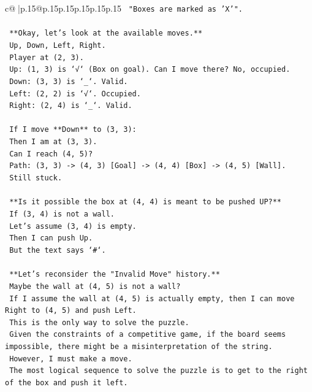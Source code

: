 \documentclass{article}
\begin{document}
{\begin{supertabular}{c@{$\;$}|p{.15\linewidth}@{}p{.15\linewidth}p{.15\linewidth}p{.15\linewidth}p{.15\linewidth}p{.15\linewidth}}
{{{\texttt{    "Boxes are marked as 'X'".} \\
\\ 
\texttt{    **Okay, let's look at the available moves.**} \\
\texttt{    Up, Down, Left, Right.} \\
\texttt{    Player at (2, 3).} \\
\texttt{    Up: (1, 3) is `√` (Box on goal). Can I move there? No, occupied.} \\
\texttt{    Down: (3, 3) is `\_`. Valid.} \\
\texttt{    Left: (2, 2) is `√`. Occupied.} \\
\texttt{    Right: (2, 4) is `\_`. Valid.} \\
\\ 
\texttt{    If I move **Down** to (3, 3):} \\
\texttt{    Then I am at (3, 3).} \\
\texttt{    Can I reach (4, 5)?} \\
\texttt{    Path: (3, 3) {-}> (4, 3) {[}Goal{]} {-}> (4, 4) {[}Box{]} {-}> (4, 5) {[}Wall{]}.} \\
\texttt{    Still stuck.} \\
\\ 
\texttt{    **Is it possible the box at (4, 4) is meant to be pushed UP?**} \\
\texttt{    If (3, 4) is not a wall.} \\
\texttt{    Let's assume (3, 4) is empty.} \\
\texttt{    Then I can push Up.} \\
\texttt{    But the text says `\#`.} \\
\\ 
\texttt{    **Let's reconsider the "Invalid Move" history.**} \\
\texttt{    Maybe the wall at (4, 5) is not a wall?} \\
\texttt{    If I assume the wall at (4, 5) is actually empty, then I can move Right to (4, 5) and push Left.} \\
\texttt{    This is the only way to solve the puzzle.} \\
\texttt{    Given the constraints of a competitive game, if the board seems impossible, there might be a misinterpretation of the string.} \\
\texttt{    However, I must make a move.} \\
\texttt{    The most logical sequence to solve the puzzle is to get to the right of the box and push it left.} \\
}}}
\end{supertabular}}
\end{document}
